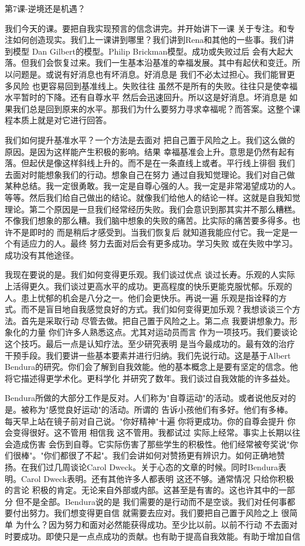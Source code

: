 第7课-逆境还是机遇？ 

我们今天的课。要把自我实现预言的信念讲完。并开始讲下一课 关于专注。和专注如何创造现实。我们上一课讲到哪里？我们讲到Rena和其他的一些事。我们讲到模型 Dan Gilbert的模型。Philip Brickman模型。成功或失败过后 会有大起大落。但我们会恢复过来。我们一生基本沿基准的幸福发展。其中有起伏和变迁。所以问题是。或说有好消息也有坏消息。好消息是 我们不必太过担心。我们能冒更多风险 也更容易回到基准线上。失败往往 虽然不是所有的失败。往往只是使幸福水平暂时的下降。还有自尊水平 然后会迅速回升。所以这是好消息。坏消息是 如果我们总是回到原来的水平。那我们为什么要努力寻求幸福呢？而答案。这整个课程本质上就是对它进行回答。 

我们如何提升基准水平？一个方法是去面对 把自己置于风险之上。我们这么做的原因。是因为这样能产生积极的影响。结果 幸福基准会上升。意思是仍然有起有落。但起伏是像这样斜线上升的。而不是在一条直线上或者。平行线上徘徊 我们去面对时能想象我们的行动。想象自己在努力 通过自我知觉理论。我们对自己做某种总结。我一定很勇敢。我一定是自尊心强的人。我一定是非常渴望成功的人。等等。然后我们给自己做出的结论。就像我们给他人的结论一样。这就是自我知觉理论。第二个原因是一旦我们经常经历失败。我们会意识到那其实并不那么糟糕。不像我们想象的那么糟。我们脑中想象的失败的痛苦。比实际的痛苦要多得多。也许不是即时的 而是稍后才感受到。当我们恢复后 就知道我能应付它。我一定是一个有适应力的人。最终 努力去面对后会有更多成功。学习失败 或在失败中学习。成功没有其他途径。 

我现在要说的是。我们如何变得更乐观。我们谈过优点 谈过长寿。乐观的人实际上活得更久。我们谈过更高水平的成功。更高程度的快乐更能克服忧郁。乐观的人。患上忧郁的机会是八分之一。他们会更快乐。再说一遍 乐观是指诠释的方式。而不是盲目地自我感觉良好的方式。我们如何变得更加乐观？我想谈谈三个方法。首先是采取行动 尽管去做。把自己置于风险之上。第二点 我要讲想象力。形象化的力量 你们许多人熟悉这点。尤其对运动员而言 作为一项技巧。我们要谈论这个技巧。最后一点是认知疗法。至少研究表明 是当今最成功的。最有效的治疗干预手段。我们要讲一些基本要素并进行归纳。我们先说行动。这是基于Albert Bendura的研究。你们会了解到自我效能。他的基本概念上是要有坚定的信念。他将它描述得更学术化。更科学化 并研究了数年。我们谈过自我效能的许多益处。 

Bendura所做的大部分工作是反对。人们称为"自尊运动"的活动。或者说他反对的是。被称为"感觉良好运动"的活动。所谓的 告诉小孩他们有多好。他们有多棒。每天早上站在镜子前对自己说。"你好精神"十遍 你将更成功。你的自尊会提升 你会变得很好。这不管用 相信我 这不管用。我都试过 实际上经常。事实上长期以往会造成伤害 会伤到自尊。它实际伤害了那些学生的积极性。他们经常被夸奖说"你们很棒"。"你们都很了不起"。我们会讲如何对赞扬更有辨识力。如何正确地赞扬。在我们过几周谈论Carol Dweck。关于心态的文章的时候。同时Bendura表明。Carol Dweck表明。还有其他许多人都表明 这还不够。通常情况 只给你积极的言论 积极的肯定。无论来自外部或内部。这甚至是有害的。这也许其中的一部分 但不是全部。Bendura说的是 我们需要的是行动而不是空谈。我们对任何事都要付出努力。我们想变得更自信 就需要去应对。我们要把自己置于风险之上 很简单 为什么？因为努力和面对必然能获得成功。至少比以前。以前不行动 不去面对时要成功。即使只是一点点成功的贡献。也有助于提高自我效能。有助于增加自信 

